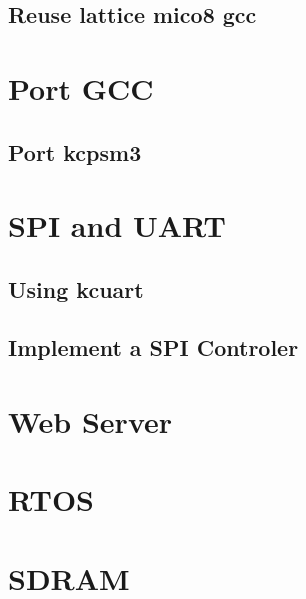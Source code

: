 \documentclass[a4paper]{book}
\begin{document}
\begin{CJK*}{UTF8}{song}
\chapter{Reuse lattice mico8 gcc}

\part{Port GCC}

\chapter{Port kcpsm3}

\part{SPI and UART}
\chapter{Using kcuart}
\chapter{Implement a SPI Controler}

\part{Web Server}

\part{RTOS}

\part{SDRAM}


\end{CJK*} 
\end{document}
